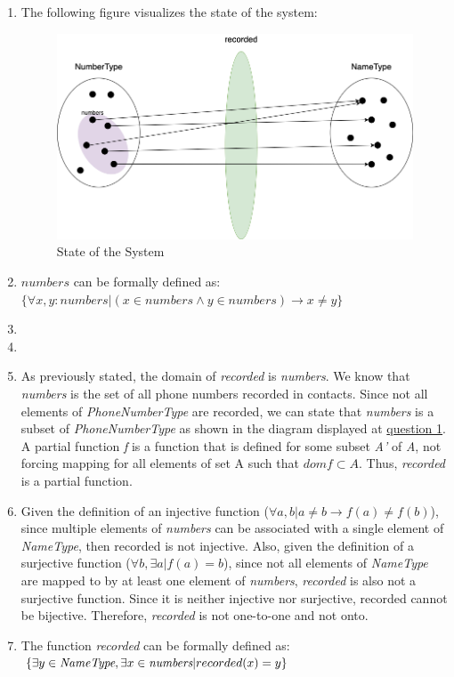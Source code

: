 \begin{enumerate}
    \item The following figure visualizes the state of the system:
        \begin{figure}[h]
        \centering
        \includegraphics[scale=0.45]{images/Diagram.png}
        \caption{State of the System}
        \label{fig:Diagram}
        \end{figure}
    \item $numbers$ can be formally defined as: \\
    $\{ \forall x, y: numbers | (x \in numbers \wedge y \in numbers) \rightarrow x \neq y \}$
    \item
    \item
    \item As previously stated, the domain of \emph{recorded} is \emph{numbers}. We know that \emph{numbers} is the set 
    of all phone numbers recorded in contacts. Since not all elements of \emph{PhoneNumberType} are recorded, we can
    state that \emph{numbers} is a subset of \emph{PhoneNumberType} as shown in the diagram displayed at \underline{question 1}.
    A partial function \emph{f} is a function that is defined for some subset \emph{A'} of \emph{A}, not forcing mapping for 
    all elements of set A such that $dom f \subset A$. Thus, \emph{recorded} is a partial function.
    \item Given the definition of an injective function ($\forall a, b | a \neq b \rightarrow f(a) \neq f(b) $), since multiple 
    elements of \emph{numbers} can be associated with a single element of \emph{NameType}, then recorded is not injective. Also, 
    given the definition of a surjective function ($\forall b,   \exists a | f(a) = b$), since not all elements of \emph{NameType} 
    are mapped to by at least one element of \emph{numbers}, \emph{recorded} is also not a surjective function. Since it is 
    neither injective nor surjective, recorded cannot be bijective. Therefore, \emph{recorded} is not one-to-one and not onto. 
    \item The function \emph{recorded} can be formally defined as:\\
    $\{ \exists y \in \emph{NameType},   \exists x \in \emph{numbers} | recorded(x) = y \}$
\end{enumerate}
